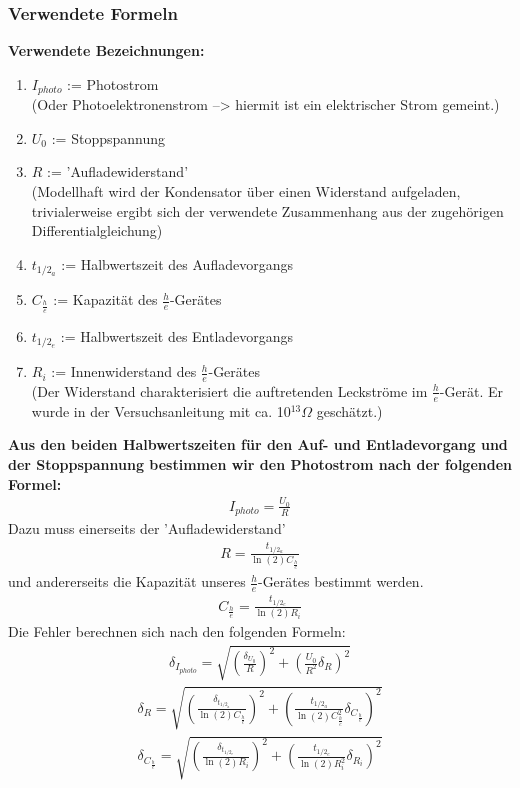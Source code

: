 \documentclass[12px]{scrartcl}
\begin{document}
\subsubsection{Verwendete Formeln}
\textbf{Verwendete Bezeichnungen:}
\begin{enumerate}
\item $I_{photo}$ := Photostrom\\
(Oder Photoelektronenstrom --> hiermit ist ein elektrischer Strom gemeint.)
\item $U_0$ := Stoppspannung
\item $R$ := 'Aufladewiderstand'\\
(Modellhaft wird der Kondensator über einen Widerstand aufgeladen, trivialerweise ergibt sich der verwendete Zusammenhang aus der zugehörigen Differentialgleichung)
\item $t_{1/2_a}$ := Halbwertszeit des Aufladevorgangs
\item $C_{\frac{h}{e}}$ := Kapazität des $\frac{h}{e}$-Gerätes
\item $t_{1/2_e}$ := Halbwertszeit des Entladevorgangs
\item $R_i$ := Innenwiderstand des $\frac{h}{e}$-Gerätes\\
(Der Widerstand charakterisiert die auftretenden Leckströme im $\frac{h}{e}$-Gerät. Er wurde in der Versuchsanleitung mit ca. 10$^{13}\Omega$ geschätzt.)
\end{enumerate}
\textbf{Aus den beiden Halbwertszeiten für den Auf- und Entladevorgang und der Stoppspannung bestimmen wir den Photostrom nach der folgenden Formel:}
\begin{align}
I_{photo} = \frac{U_0}{R}
\label{eqn:i_ph}
\end{align}
Dazu muss einerseits der 'Aufladewiderstand'
\begin{align}
R = \frac{t_{1/2_a}}{\ln(2)C_{\frac{h}{e}}}
\label{eqn:R}
\end{align}
und andererseits die Kapazität unseres $\frac{h}{e}$-Gerätes bestimmt werden.
\begin{align}
C_{\frac{h}{e}} = \frac{t_{1/2_e}}{\ln(2)R_i}
\label{eqn:C}
\end{align}
Die Fehler berechnen sich nach den folgenden Formeln:
\begin{align}
\delta_{I_{photo}}= \sqrt{
\left(\frac{\delta_{U_0}}{R}\right)^2+
\left(\frac{U_0}{R^2}\delta_R\right)^2}
\label{eqn:i_ph_delta}
\end{align}
\begin{align}
\delta_{R}= \sqrt{
\left(\frac{\delta_{t_{1/2_a}}}{\ln(2)C_{\frac{h}{e}}}\right)^2+
\left(\frac{t_{1/2_a}}{\ln(2)C_{\frac{h}{e}}^2}\delta_{C_{\frac{h}{e}}}\right)^2}
\label{eqn:r_delta}
\end{align}
\begin{align}
\delta_{C_{\frac{h}{e}}}= \sqrt{
\left(\frac{\delta_{t_{1/2_e}}}{\ln(2)R_i}\right)^2+
\left(\frac{t_{1/2_e}}{\ln(2)R_i^2}\delta_{R_i}\right)^2}
\label{eqn:c_delta}
\end{align}
\end{document}
